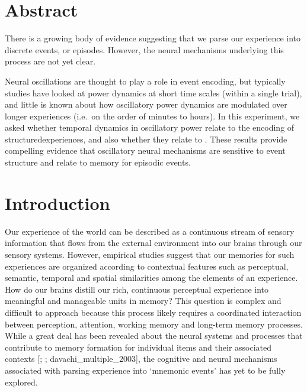 \section{Abstract}\label{abstract}

There is a growing body of evidence suggesting that we parse our
experience into discrete events, or episodes. However, the neural
mechanisms underlying this process are not yet clear.

Neural oscillations are thought to play a role in event encoding, but
typically studies have looked at power dynamics at short time scales
(within a single trial), and little is known about how oscillatory power
dynamics are modulated over longer experiences (i.e.~on the order of
minutes to hours). In this experiment, we asked whether temporal
dynamics in oscillatory power relate to the encoding of
structuredexperiences, and also whether they relate to . These results
provide compelling evidence that oscillatory neural mechanisms are
sensitive to event structure and relate to memory for episodic events.

\section{Introduction}\label{introduction}

Our experience of the world can be described as a continuous stream of
sensory information that flows from the external environment into our
brains through our sensory systems. However, empirical studies suggest
that our memories for such experiences are organized according to
contextual features such as perceptual, semantic, temporal and spatial
similarities among the elements of an experience. How do our brains
distill our rich, continuous perceptual experience into meaningful and
manageable units in memory? This question is complex and difficult to
approach because this process likely requires a coordinated interaction
between perception, attention, working memory and long-term memory
processes. While a great deal has been revealed about the neural systems
and processes that contribute to memory formation for individual items
and their associated contexts {[}\textcite{davachi_item_2006};
\textcite{ranganath_neural_2003}; davachi\_multiple\_2003{]}, the
cognitive and neural mechanisms associated with parsing experience into
`mnemonic events' has yet to be fully explored.

